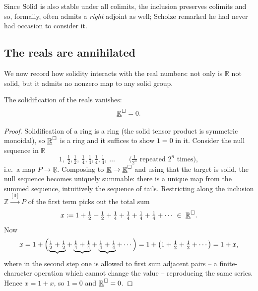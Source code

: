 \begin{remark}
\label{rmk:5:right-adjoint}
Since $\mathrm{Solid}$ is also stable under all colimits, the inclusion preserves
colimits and so, formally, often admits a \emph{right} adjoint as well; Scholze
remarked he had never had occasion to consider it.
\end{remark}

\subsection{The reals are annihilated}

We now record how solidity interacts with the real numbers: not only is
$\mathbb{R}$ not solid, but it admits no nonzero map to any solid group.

\begin{lemma}[$\mathbb{R}^{\solid}=0$]
\label{lem:5:R-solid-zero}
The solidification of the reals vanishes:
\begin{equation*}
\underline{\mathbb{R}}^{\square}=0 .
\end{equation*}
\end{lemma}

\begin{proof}
Solidification of a ring is a ring (the solid tensor product is symmetric
monoidal), so $\underline{\mathbb{R}}^{\square}$ is a ring and it suffices to show
$1=0$ in it. Consider the null sequence in $\mathbb{R}$
\begin{equation*}
1,\ \tfrac12,\tfrac12,\ \tfrac14,\tfrac14,\tfrac14,\tfrac14,\ \dots
\qquad\bigl(\tfrac{1}{2^{n}}\text{ repeated } 2^{n}\text{ times}\bigr),
\end{equation*}
i.e.\ a map $P\to\underline{\mathbb{R}}$. Composing to
$\underline{\mathbb{R}}\to\underline{\mathbb{R}}^{\square}$ and using that the target
is solid, the null sequence becomes uniquely summable: there is a unique map from
the summed sequence, intuitively the sequence of tails. Restricting along the
inclusion $\mathbb{Z}\xrightarrow{[0]}P$ of the first term picks out the total sum
\begin{equation*}
x:=1+\tfrac12+\tfrac12+\tfrac14+\tfrac14+\tfrac14+\tfrac14+\cdots\ \in\
\underline{\mathbb{R}}^{\solid}.
\end{equation*}
Now
\begin{equation*}
x=1+\Bigl(\underbrace{\tfrac12+\tfrac12}+\underbrace{\tfrac14+\tfrac14}
+\underbrace{\tfrac14+\tfrac14}+\cdots\Bigr)
=1+\bigl(1+\tfrac12+\tfrac12+\cdots\bigr)=1+x ,
\end{equation*}
where in the second step one is allowed to first sum adjacent pairs -- a
finite-character operation which cannot change the value -- reproducing the same
series. Hence $x=1+x$, so $1=0$ and $\underline{\mathbb{R}}^{\square}=0$.
\end{proof}

